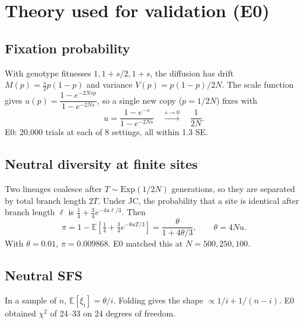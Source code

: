 \documentclass[11pt]{article}
\theoremstyle{definition}
\newcommand{\E}{\mathbb{E}}
\begin{document}
\section{Theory used for validation (E0)}\label{sec:theory}
\subsection{Fixation probability}
With genotype fitnesses $1,1+s/2,1+s$, the diffusion has drift $M(p)=\tfrac{s}{2}p(1-p)$ and variance
$V(p)=p(1-p)/2N$. The scale function gives $u(p)=\dfrac{1-e^{-2Nsp}}{1-e^{-2Ns}}$, so a single new copy
($p=1/2N$) fixes with
\begin{equation}
u=\frac{1-e^{-s}}{1-e^{-2Ns}}\quad\xrightarrow{s\to0}\quad\frac{1}{2N}.
\end{equation}
E0: 20{,}000 trials at each of 8 settings, all within 1.3 SE.

\subsection{Neutral diversity at finite sites}
Two lineages coalesce after $T\sim\text{Exp}(1/2N)$ generations, so they are separated by total branch length $2T$.
Under JC, the probability that a site is identical after branch length $\ell$ is $\tfrac14+\tfrac34e^{-4u\ell/3}$.
Then
\begin{equation}
\pi=1-\E\!\left[\tfrac14+\tfrac34e^{-8uT/3}\right]=\frac{\theta}{1+4\theta/3},\qquad \theta=4Nu.
\end{equation}
With $\theta=0.01$, $\pi=0.009868$. E0 matched this at $N=500,250,100$.

\subsection{Neutral SFS}
In a sample of $n$, $\E[\xi_i]=\theta/i$. Folding gives the shape $\propto 1/i+1/(n-i)$. E0 obtained $\chi^2$ of 24--33
on 24 degrees of freedom.
\end{document}
